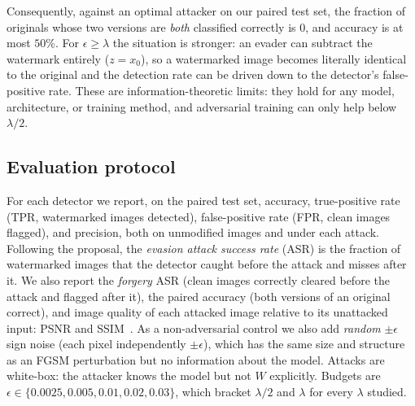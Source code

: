 \documentclass[sigconf, nonacm]{acmart}
\begin{document}
\noindent Consequently, against an optimal attacker on our paired test set, the fraction of
originals whose two versions are \emph{both} classified correctly is $0$, and accuracy is at most
$50\%$. For $\epsilon \ge \lambda$ the situation is stronger: an evader can subtract the watermark
entirely ($z = x_0$), so a watermarked image becomes literally identical to the original and the
detection rate can be driven down to the detector's false-positive rate. These are
information-theoretic limits: they hold for any model, architecture, or training method, and
adversarial training can only help below $\lambda/2$.

\subsection{Evaluation protocol}
For each detector we report, on the paired test set, accuracy, true-positive rate (TPR,
watermarked images detected), false-positive rate (FPR, clean images flagged), and precision,
both on unmodified images and under each attack. Following the proposal, the \emph{evasion attack
success rate} (ASR) is the fraction of watermarked images that the detector caught before the
attack and misses after it. We also report the \emph{forgery} ASR (clean images correctly cleared
before the attack and flagged after it), the paired accuracy (both versions of an original
correct), and image quality of each attacked image relative to its unattacked input: PSNR and
SSIM~\cite{wang2004ssim}. As a non-adversarial control we also add \emph{random} $\pm\epsilon$
sign noise (each pixel independently $\pm\epsilon$), which has the same size and structure as an
FGSM perturbation but no information about the model. Attacks are white-box: the attacker knows the model but not $W$
explicitly. Budgets are $\epsilon \in \{0.0025, 0.005, 0.01, 0.02, 0.03\}$, which bracket
$\lambda/2$ and $\lambda$ for every $\lambda$ studied.
\end{document}
